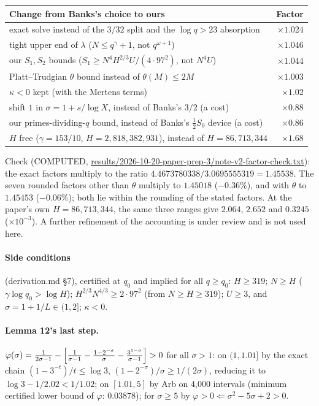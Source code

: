 \documentclass[11pt]{article}
\begin{document}
\begin{center}
\begin{tabular}{@{}lr@{}}
\toprule
Change from Banks's choice to ours & Factor\\
\midrule
exact solve instead of the $3/32$ split and the $\log q>23$ absorption & $\times1.024$\\
tight upper end of $\lambda$ ($N\le q^\gamma+1$, not $q^{\omega+1}$) & $\times1.046$\\
our $S_1,S_2$ bounds ($S_1\ge N^4H^{2/3}U/(4\cdot97^2)$, not $N^4U$) & $\times1.044$\\
Platt--Trudgian $\theta$ bound instead of $\theta(M)\le 2M$ & $\times1.003$\\
$\kappa<0$ kept (with the Mertens terms) & $\times1.02$\\
shift $1$ in $\sigma=1+s/\log X$, instead of Banks's $3/2$ (a cost) & $\times0.88$\\
our primes-dividing-$q$ bound, instead of Banks's $\frac12S_0$ device (a cost) & $\times0.86$\\
$H$ free ($\gamma=153/10$, $H=2{,}818{,}382{,}931$), instead of $H=86{,}713{,}344$ & $\times1.68$\\
\bottomrule
\end{tabular}
\end{center}
Check (COMPUTED, \url{results/2026-10-20-paper-prep-3/note-v2-factor-check.txt}): the exact factors multiply to the ratio $4.4673780338/3.0695555319 = 1.45538$. The seven rounded factors other than $\theta$ multiply to $1.45018$ ($-0.36\%$), and with $\theta$ to $1.45453$ ($-0.06\%$); both lie within the rounding of the stated factors.
At the paper's own $H=86{,}713{,}344$, the same three ranges give $2.064$, $2.652$ and $0.3245$ ($\times10^{-3}$).
A further refinement of the accounting is under review and is not used here.

\paragraph{Side conditions} (derivation.md \S7), certified at $q_0$ and implied for all $q\ge q_0$:
$H\ge 319$; $N\ge H$ ($\gamma\log q_0>\log H$); $H^{2/3}N^{4/3}\ge 2\cdot97^2$ (from $N\ge H\ge 319$); $U\ge 3$, and $\sigma=1+1/L\in(1,2]$; $\kappa<0$.

\paragraph{Lemma 12's last step.}
$\varphi(\sigma) = \frac{1}{2\sigma-1} - \Bigl[\frac{1}{\sigma-1} - \frac{1-2^{-\sigma}}{\sigma} - \frac{3^{1-\sigma}}{\sigma-1}\Bigr] > 0$ for all $\sigma>1$:
on $(1,1.01]$ by the exact chain $(1-3^{-t})/t\le\log 3$, $(1-2^{-\sigma})/\sigma\ge 1/(2\sigma)$, reducing it to $\log 3 - 1/2.02 < 1/1.02$;
on $[1.01,5]$ by Arb on 4{,}000 intervals (minimum certified lower bound of $\varphi$: $0.03878$);
for $\sigma\ge 5$ by $\varphi>0 \Leftarrow \sigma^2-5\sigma+2>0$.
\end{document}
